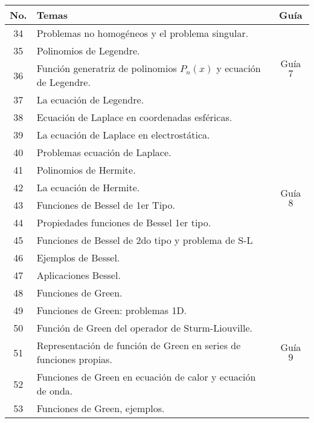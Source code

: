 \begin{table}[H]
	\centering
	\begin{tabular}{||c|p{13cm}||c||}
		\hline
		\hline
			No. & Temas & Guía \\
		\hline
		\hline
			34 & Problemas no homogéneos y el problema singular. & \multirow{4}{2cm}{Guía $7$} \\
			35 & Polinomios de Legendre. & \\
			36 & Función generatriz de polinomios $P_n (x)$ y ecuación de Legendre. & \\
			37 & La ecuación de Legendre. & \\
		\hline
			38 & Ecuación de Laplace en coordenadas esféricas. & \multirow{10}{2cm}{Guía $8$} \\
			39 & La ecuación de Laplace en electrostática. & \\
			40 & Problemas ecuación de Laplace. & \\
			41 & Polinomios de Hermite. & \\
			42 & La ecuación de Hermite. & \\
			43 & Funciones de Bessel de 1er Tipo. & \\
			44 & Propiedades funciones de Bessel 1er tipo. & \\
			45 & Funciones de Bessel de 2do tipo y problema de S-L & \\
			46 & Ejemplos de Bessel. &  \\
			47 & Aplicaciones Bessel. &  \\
		\hline
			48 & Funciones de Green. & \multirow{6}{2cm}{Guía $9$} \\
			49 & Funciones de Green: problemas 1D. &  \\
			50 & Función de Green del operador de Sturm-Liouville. &  \\
			51 & Representación de función de Green en series de funciones propias. &  \\
			52 & Funciones de Green en ecuación de calor y ecuación de onda. &  \\
			53 & Funciones de Green, ejemplos. &  \\
		\hline
		\hline
	\end{tabular}
\end{table}





